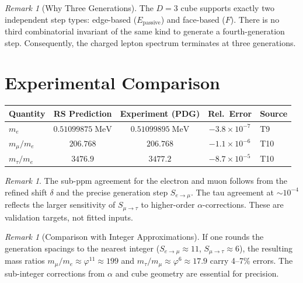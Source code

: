 \documentclass[12pt,a4paper]{article}
\theoremstyle{definition}
\theoremstyle{remark}
\newtheorem{remark}[theorem]{Remark}
\begin{document}
\begin{remark}[Why Three Generations]
The $D = 3$ cube supports exactly two independent step types:
edge-based ($E_{\mathrm{passive}}$) and face-based ($F$).
There is no third combinatorial invariant of the same kind
to generate a fourth-generation step.  Consequently, the
charged lepton spectrum terminates at three generations.
\end{remark}

\section{Experimental Comparison}
\label{sec:comparison}

\begin{center}
\renewcommand{\arraystretch}{1.3}
\begin{tabular}{lcccl}
\toprule
\textbf{Quantity} & \textbf{RS Prediction}
  & \textbf{Experiment (PDG)}
  & \textbf{Rel.\ Error} & \textbf{Source} \\
\midrule
$m_e$ & $0.51099875\;\mathrm{MeV}$
  & $0.51099895\;\mathrm{MeV}$ & $-3.8 \times 10^{-7}$
  & T9 \\
$m_\mu/m_e$ & $206.768$
  & $206.768$ & $-1.1 \times 10^{-6}$
  & T10 \\
$m_\tau/m_e$ & $3476.9$
  & $3477.2$ & $-8.7 \times 10^{-5}$
  & T10 \\
\bottomrule
\end{tabular}
\end{center}

\begin{remark}
The sub-ppm agreement for the electron and muon follows from
the refined shift $\delta$ and the precise generation step
$S_{e \to \mu}$.  The tau agreement at $\sim\!10^{-4}$ reflects
the larger sensitivity of $S_{\mu \to \tau}$ to higher-order
$\alpha$-corrections.  These are validation targets, not fitted
inputs.
\end{remark}

\begin{remark}[Comparison with Integer Approximations]
If one rounds the generation spacings to the nearest integer
($S_{e \to \mu} \approx 11$, $S_{\mu \to \tau} \approx 6$),
the resulting mass ratios
$m_\mu/m_e \approx \varphi^{11} \approx 199$ and
$m_\tau/m_\mu \approx \varphi^6 \approx 17.9$ carry 4--7\%
errors.  The sub-integer corrections from $\alpha$ and cube
geometry are essential for precision.
\end{remark}
\end{document}
